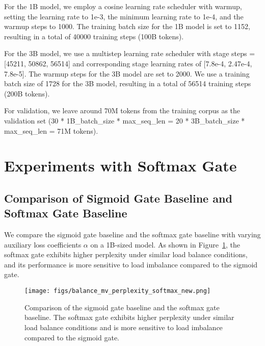 \documentclass{article} %
\newcommand{\ours}{Loss-Free Balancing}
\begin{document}
For the 1B model, we employ a cosine learning rate scheduler with warmup, setting the learning rate to 1e-3, the minimum learning rate to 1e-4, and the warmup steps to 1000. The training batch size for the 1B model is set to 1152, resulting in a total of 40000 training steps (100B tokens).

For the 3B model, we use a multistep learning rate scheduler with stage steps = [45211, 50862, 56514] and corresponding stage learning rates of [7.8e-4, 2.47e-4, 7.8e-5]. The warmup steps for the 3B model are set to 2000. We use a training batch size of 1728 for the 3B model, resulting in a total of 56514 training steps (200B tokens).

For validation, we leave around 70M tokens from the training corpus as the validation set (30 * 1B\_batch\_size * max\_seq\_len = 20 * 3B\_batch\_size * max\_seq\_len = 71M tokens).

\section{Experiments with Softmax Gate}
\label{app:softmax_gate}
\subsection{Comparison of Sigmoid Gate Baseline and Softmax Gate Baseline}
We compare the sigmoid gate baseline and the softmax gate baseline with varying auxiliary loss coefficients $\alpha$ on a 1B-sized model. As shown in Figure~\ref{fig:softmax_sigmoid_comparison}, the softmax gate exhibits higher perplexity under similar load balance conditions, and its performance is more sensitive to load imbalance compared to the sigmoid gate.

\begin{figure}[t]
\centering
\texttt{[image: figs/balance\_mv\_perplexity\_softmax\_new.png]}
\caption{Comparison of the sigmoid gate baseline and the softmax gate baseline. The softmax gate exhibits higher perplexity under similar load balance conditions and is more sensitive to load imbalance compared to the sigmoid gate.}
\label{fig:softmax_sigmoid_comparison}
\end{figure}


\end{document}
